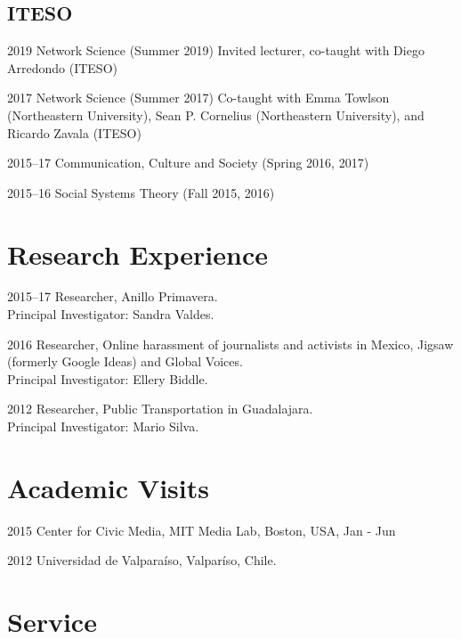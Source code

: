 \documentclass{academiccv}
\begin{document}
\subsection*{ITESO}
\begin{tablist}
	\item[2019] \tab Network Science (Summer 2019) Invited lecturer, co-taught with Diego Arredondo (ITESO)
	\item[2017]	\tab Network Science (Summer 2017) Co-taught with Emma Towlson (Northeastern University), Sean P. Cornelius (Northeastern University), and Ricardo Zavala (ITESO)
	\item [2015--17]\tab Communication, Culture and Society (Spring 2016, 2017)
	\item [2015--16]\tab Social Systems Theory (Fall 2015, 2016)
\end{tablist} 

\section*{Research Experience}
\begin{tablist}
	\item[2015--17] 	\tab Researcher, Anillo Primavera. \\
									Principal Investigator: Sandra Valdes.
	\item[2016] 	\tab Researcher, Online harassment of journalists and activists in Mexico, Jigsaw (formerly Google Ideas) and Global Voices. \\
								Principal Investigator: Ellery Biddle.
	\item[2012] \tab Researcher, Public Transportation in Guadalajara. \\
							Principal Investigator: Mario Silva.
\end{tablist}

\section*{Academic Visits}
\begin{tablist}
	\item[2015] 	\tab Center for Civic Media, MIT Media Lab, Boston, USA, Jan - Jun
	\item[2012] 	\tab Universidad de Valparaíso, Valparíso, Chile.
\end{tablist}

\section*{Service}
\end{document}

